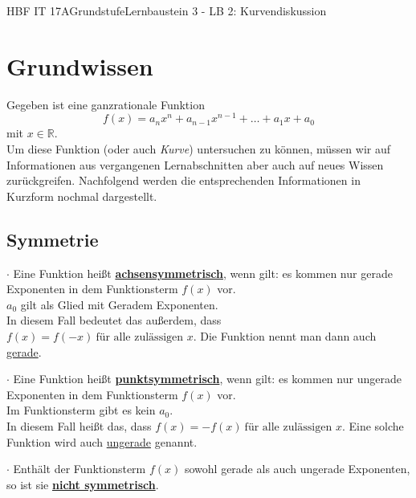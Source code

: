 \documentclass[11pt,twocolumn,oneside,openany,headings=optiontotoc,11pt,numbers=noenddot]{article}
\begin{document}
	\begin{worksheet}{HBF IT 17A}{Grundstufe}{Lernbaustein 3 - LB 2: Kurvendiskussion}
		\section{Grundwissen}
		Gegeben ist eine ganzrationale Funktion \[f(x) = a_nx^n + a_{n-1}x^{n-1} + \ldots + a_1x + a_0 \] mit \(x\in\mathbb{R}\).\\
		Um diese Funktion (oder auch \textit{Kurve}) untersuchen zu können, müssen wir auf Informationen aus vergangenen Lernabschnitten aber auch auf neues Wissen zurückgreifen. Nachfolgend werden die entsprechenden Informationen in Kurzform nochmal dargestellt.
		\subsection*{Symmetrie} \(\cdot\) Eine Funktion heißt \underline{\textbf{achsensymmetrisch}}, wenn gilt: es kommen nur gerade Exponenten in dem Funktionsterm \(f(x)\) vor.\\
		\tiny{\(a_0\) gilt als Glied mit Geradem Exponenten.}\normalsize\\
		In diesem Fall bedeutet das außerdem, dass \(f(x) = f(-x)\ \text{für alle zulässigen } x\). Die Funktion nennt man dann auch \underline{gerade}.\\
		\par\noindent
		\(\cdot\) Eine Funktion heißt \underline{\textbf{punktsymmetrisch}}, wenn gilt: es kommen nur ungerade Exponenten in dem Funktionsterm \(f(x)\) vor.\\
		\tiny{Im Funktionsterm gibt es kein \(a_0\).}\normalsize\\
		In diesem Fall heißt das, dass \(f(x) = -f(x)\ \text{für alle zulässigen } x\). Eine solche Funktion wird auch \underline{ungerade} genannt.\\
		\par\noindent
		\(\cdot\) Enthält der Funktionsterm \(f(x)\) sowohl gerade als auch ungerade Exponenten, so ist sie \underline{\textbf{nicht symmetrisch}}.

\end{worksheet}
\end{document}

